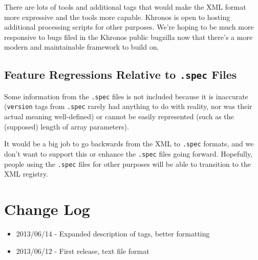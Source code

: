 \documentclass{article}
\def\code#1{{\tt #1}}
\begin{document}
There are lots of tools and additional tags that would make the XML
format more expressive and the tools more capable. Khronos is open to
hosting additional processing scripts for other purposes. We're hoping
to be much more responsive to bugs filed in the Khronos public bugzilla
now that there's a more modern and maintainable framework to build on.


\subsection{Feature Regressions Relative to \code{.spec} Files}
\label{general:regressions}

Some information from the \code{.spec} files is not included because it
is inaccurate (\code{version} tags from \code{.spec} rarely had anything
to do with reality, nor was their actual meaning well-defined) or cannot
be easily represented (such as the (supposed) length of array
parameters).

It would be a big job to go backwards from the XML to \code{.spec}
formats, and we don't want to support this or enhance the \code{.spec}
files going forward. Hopefully, people using the \code{.spec} files for
other purposes will be able to transition to the XML registry.


\section{Change Log}
\label{changelog}

\begin{itemize}
\item 2013/06/14 - Expanded description of tags, better formatting
\item 2013/06/12 - First release, text file format
\end{itemize}



\end{document}

